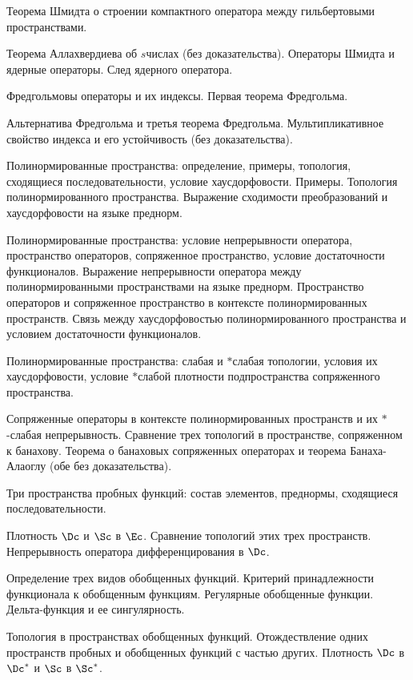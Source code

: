 \documentclass[a4paper]{article}
\begin{document}
\begin{nums}{-3}
\item Теорема Шмидта о строении компактного оператора между гильбертовыми пространствами.
\item Теорема Аллахвердиева об $s$\д числах (без доказательства). Операторы Шмидта и
ядерные операторы. След ядерного оператора.
\item Фредгольмовы операторы и их индексы. Первая теорема Фредгольма.
\item Альтернатива Фредгольма и третья теорема Фредгольма. Мультипликативное свойство
индекса и его устойчивость (без доказательства).
\item Полинормированные пространства: определение, примеры, топология, сходящиеся последовательности, условие хаусдорфовости.
Примеры. Топология полинормированного пространства. Выражение сходимости преобразований и хаусдорфовости на языке преднорм.
\item Полинормированные пространства: условие непрерывности оператора, пространство операторов, сопряженное пространство,
условие достаточности функционалов.  Выражение непрерывности оператора между полинормированными пространствами на языке преднорм.
Пространство операторов и сопряженное пространство в контексте полинормированных пространств. Связь между хаусдорфовостью
полинормированного пространства и условием достаточности функционалов.
\item Полинормированные пространства: слабая и $*$\д слабая топологии, условия их хаусдорфовости, условие $*$\д слабой
плотности подпространства сопряженного пространства.
\item Сопряженные операторы в контексте полинормированных пространств и их $*$-слабая непрерывность.
Сравнение трех топологий в пространстве, сопряженном к банахову. Теорема о банаховых сопряженных
операторах и теорема Банаха-Алаоглу (обе без доказательства).
\item  Три пространства пробных функций: состав элементов, преднормы, сходящиеся последовательности.
\item Плотность $\Dc$ и $\Sc$ в $\Ec$. Сравнение топологий этих трех пространств.
Непрерывность оператора дифференцирования в $\Dc$.
\item  Определение трех видов обобщенных функций. Критерий принадлежности
функционала к обобщенным функциям. Регулярные обобщенные функции.
Дельта-функция и ее сингулярность.
\item  Топология в пространствах обобщенных функций. Отождествление одних пространств пробных
и обобщенных функций с частью других. Плотность $\Dc$ в $\Dc^*$ и $\Sc$ в $\Sc^*$.

\end{nums}
\end{document}
